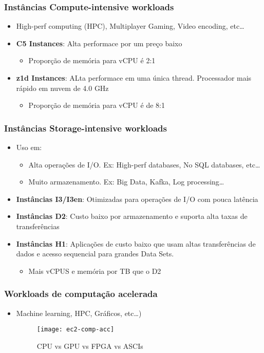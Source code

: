 \begin{frame}
	\frametitle{Instâncias Compute-intensive workloads}
	\begin{itemize}
		\item High-perf computing (HPC), Multiplayer Gaming, Video encoding, etc\dots
		\item \textbf{C5 Instances}: Alta performace por um preço baixo
			\begin{itemize}
				\item Proporção de memória para vCPU é 2:1
			\end{itemize}
		\item \textbf{z1d Instances}: ALta performace em uma única thread. Processador mais rápido em nuvem de 4.0 GHz
			\begin{itemize}
				\item Proporção de memória para vCPU é de 8:1
			\end{itemize}
	\end{itemize}
\end{frame}

\begin{frame}
	\frametitle{Instâncias Storage-intensive workloads}
	\begin{itemize}
		\item Uso em:
			\begin{itemize}
				\item Alta operações de I/O. Ex: High-perf databases, No SQL databases, etc\dots
				\item Muito armazenamento. Ex: Big Data, Kafka, Log processing\dots
			\end{itemize}
		\item \textbf{Instâncias I3/I3en}: Otimizadas para operações de I/O com pouca latência
		\item \textbf{Instâncias D2}: Custo baixo por armazenamento e suporta alta taxas de transferências
		\item \textbf{Instâncias H1}: Aplicações de custo baixo que usam altas transferências de dados e acesso sequencial para grandes Data Sets.
			\begin{itemize}
				\item Mais vCPUS e memória por TB que o D2
			\end{itemize}
	\end{itemize}
\end{frame}

\begin{frame}
	\frametitle{Workloads de computação acelerada}
	\begin{itemize}
		\item Machine learning, HPC, Gráficos, etc\dots)
		\hfill
			\begin{figure}[htpb]
				\centering
				\texttt{[image: ec2-comp-acc]}
				\caption{CPU vs GPU vs FPGA vs ASCIs\cite{CDOLR}}
			\end{figure}
	\end{itemize}
\end{frame}

